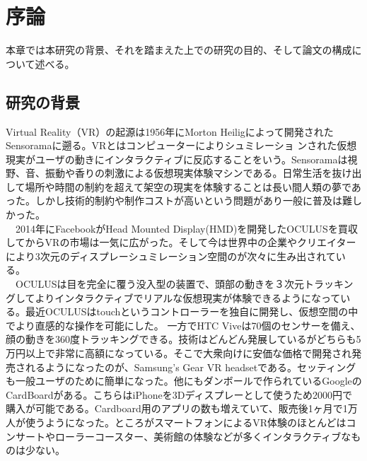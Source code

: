 \chapter{序論}
\label{chap:introduction}

本章では本研究の背景、それを踏まえた上での研究の目的、そして論文の構成について述べる。

\section{研究の背景}
Virtual Reality（VR）の起源は1956年にMorton Heiligによって開発されたSensoramaに遡る。VRとはコンピューターによりシュミレーショ ンされた仮想現実がユーザの動きにインタラクティブに反応することをいう。Sensoramaは視野、音、振動や香りの刺激による仮想現実体験マシンである\cite{sensorama}。日常生活を抜け出して場所や時間の制約を超えて架空の現実を体験することは長い間人類の夢であった\cite{verge}。しかし技術的制約や制作コストが高いという問題があり一般に普及は難しかった。\\
　2014年にFacebookがHead Mounted Display(HMD)を開発したOCULUSを買収してからVRの市場は一気に広がった\cite{vrtrendShiny}。そして今は世界中の企業やクリエイターにより3次元のディスプレーシュミレーション空間のが次々に生み出されている\cite{vrtrendSamuel}。\\
　OCULUSは目を完全に覆う没入型の装置で、頭部の動きを３次元トラッキングしてよりインタラクティブでリアルな仮想現実が体験できるようになっている。最近OCULUSはtouchというコントローラーを独自に開発し、仮想空間の中でより直感的な操作を可能にした\cite{touch}。
一方でHTC Viveは70個のセンサーを備え、顔の動きを360度トラッキングできる\cite{vive}。技術はどんどん発展しているがどちらも5万円以上で非常に高額になっている。そこで大衆向けに安価な価格で開発され発売されるようになったのが、Samsung's Gear VR headsetである\cite{samsung}。セッティングも一般ユーザのために簡単になった。他にもダンボールで作られているGoogleのCardBoardがある。こちらはiPhoneを3Dディスプレーとして使うため2000円で購入が可能である。Cardboard用のアプリの数も増えていて、販売後1ヶ月で1万人が使うようになった\cite{cardboard}。ところがスマートフォンによるVR体験のほとんどはコンサートやローラーコースター、美術館の体験などが多くインタラクティブなものは少ない。\\
